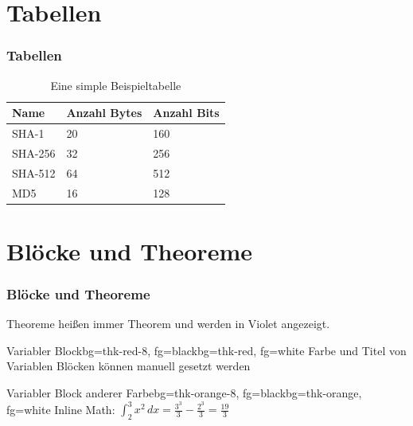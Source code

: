 \documentclass{beamer}
\begin{document}
\section{Tabellen}\label{sec:tables}
\begin{frame} 
    \frametitle{Tabellen} 
    \begin{table}[ht]
        \centering
        \begin{tabular}{ v|l|l } 
          \textbf{Name} & \textbf{Anzahl Bytes} & \textbf{Anzahl Bits} \\ 
          \hline
          SHA-1 &  20 & 160 \\ 
          \hline
          SHA-256 &  32 & 256 \\ 
          \hline
          SHA-512 &  64 & 512 \\ 
          \hline
          MD5 &  16 & 128 \\ 
        \end{tabular}
        \caption{\label{tab:example_table} Eine simple Beispieltabelle}
    \end{table}

\end{frame}

\section{Blöcke und Theoreme}\label{sec:block}
\begin{frame} 
    \frametitle{Blöcke und Theoreme} 
    \begin{theorem}
        Theoreme heißen immer Theorem und werden in Violet angezeigt.
    \end{theorem}
	
	\begin{variableblock}{Variabler Block}{bg=thk-red-8, fg=black}{bg=thk-red, fg=white}
		Farbe und Titel von Variablen Blöcken können manuell gesetzt werden
	\end{variableblock}

    \begin{variableblock}{Variabler Block anderer Farbe}{bg=thk-orange-8, fg=black}{bg=thk-orange, fg=white}
        Inline Math: $\int_2^3 x^2 \, dx=\frac{3^3}{3}-\frac{2^3}{3}=\frac{19}{3}$
    \end{variableblock}
\end{frame}
\end{document}
